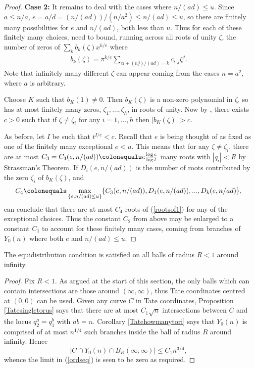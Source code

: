 \documentclass[12pt,letterpaper]{article}
\begin{document}
\begin{proof}
		
		
		
		
		\textbf{Case 2:} It remains to deal with the cases where $n/(ad)\leq u$. Since $a\leq n/a$, $e = a/d = (n/(ad))/(n/a^2)\leq n/(ad)\leq u$, so there are finitely many possibilities for $e$ and $n/(ad)$, both less than $u$. Thus for each of these finitely many choices, need to bound, running across all roots of unity $\zeta$, the number of zeros of $\sum_kb_k(\zeta)x^{k/e}$ where		
		\begin{align}\label{rootsof1}
			b_k(\zeta) = \pi^{k/e}\sum_{ei+(nj)/(ad)=k} c_{i,j}\zeta^j.
		\end{align} Note that infinitely many different $\zeta$ can appear coming from the cases $n=a^2$, where $a$ is arbitrary.
		
		Choose $K$ such that $b_K(1)\ne0$. Then $b_K(\zeta)$ is a non-zero polynomial in $\zeta$, so has at most finitely many zeros, $\zeta_1,...,\zeta_h$, in roots of unity. Now by \cite{Ber02}, there exists $c>0$ such that if $\zeta\ne \zeta_i$ for any $i=1,...,h$ then $|b_K(\zeta)|>c$. 
		
		
		As before, let $I$ be such that $t^{I/e}<c$. Recall that $e$ is being thought of as fixed as one of the finitely many exceptional $e<u$. This means that for any $\zeta\ne \zeta_i$, there are at most $C_3 = C_3(e,n/(ad)) \colonequals e\frac{\log{c}}{\log{t}}$ many roots with $|q_i|<R$ by Strassman's Theorem. If $D_i(e,n/(ad))$ is the number of roots contributed by the zero $\zeta_i$ of $b_K(\zeta)$, and \[C_4 \colonequals \max_{\{e,n/(ad)\leq u\}}\{C_3(e,n/(ad)),D_1(e,n/(ad)),...,D_k(e,n/ad)\},\] can conclude that there are at most $C_4$ roots of (\ref{rootsof1}) for any of the exceptional choices. Thus the constant $C_2$ from above may be enlarged to a constant $C_1$ to account for these finitely many cases, coming from branches of $Y_0(n)$ where both $e$ and $n/(ad)\leq u$.
	\end{proof}
	
	
	
	\begin{thm}\label{ThmInfty}
		The equidistribution condition is satisfied on all balls of radius $R<1$ around infinity.
	\end{thm}

	\begin{proof}
		Fix $R<1$. As argued at the start of this section, the only balls which can contain intersections are those around $(\infty,\infty)$, thus Tate coordinates centred at $(0,0)$ can be used. Given any curve $C$ in Tate coordinates, Proposition \ref{Tatesingletorus} says that there are at most $C_1\sqrt{n}$ intersections between $C$ and the locus $q_2^a=q_1^b$ with $ab=n$. Corollary \ref{Tatehowmanytori} says that $Y_0(n)$ is comprised of at most $n^{1/4}$ such branches inside the ball of radius $R$ around infinity. Hence 
		\[|C\cap Y_0(n)\cap B_R(\infty,\infty)|\leq C_1n^{3/4},\] whence the limit in (\ref{ordseq}) is seen to be zero as required.
	\end{proof}
	
\end{document}
